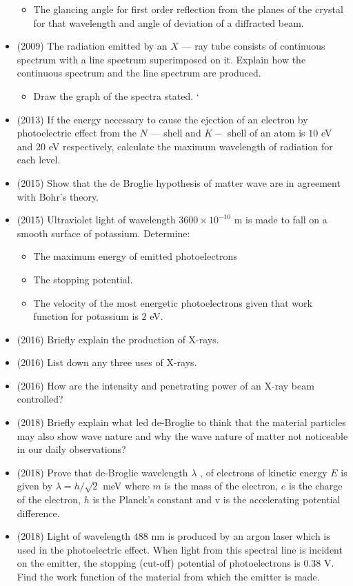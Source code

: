 \documentclass{article}
\begin{document}
\begin{itemize}
\begin{itemize}
\item The glancing angle for first order reflection from the planes of the crystal for that wavelength and angle of deviation of a diffracted beam.
\end{itemize}
\item (2009)  The radiation emitted by an $ X$ — ray tube consists of continuous spectrum with a line spectrum superimposed on it. Explain how the continuous spectrum and the line spectrum are produced.
 \begin{itemize}
\item Draw the graph of the spectra stated. ‘
\end{itemize}
\item (2013)  If the energy necessary to cause the ejection of an electron by photoelectric effect from the $ N$ — shell and $ K-$ shell of an atom is $ 10$ eV and $ 20$ eV respectively, calculate the maximum wavelength of radiation for each level.
\item (2015)  Show that the de Broglie hypothesis of matter wave are in agreement with Bohr’s theory.
\item (2015)  Ultraviolet light of wavelength $ 3600 \times 10^{-10}$ m is made to fall on a smooth surface of potassium. Determine:
 \begin{itemize}
\item The maximum energy of emitted photoelectrons
\item The stopping potential.
\item The velocity of the most energetic photoelectrons given that work function for potassium is $ 2$ eV.
\end{itemize}
\item (2016)  Briefly explain the production of X-rays.
\item (2016)  List down any three uses of X-rays.
\item (2016)  How are the intensity and penetrating power of an X-ray beam controlled?
\item (2018)  Briefly explain what led de-Broglie to think that the material particles may also show wave nature and why the wave nature of matter not noticeable in our daily observations? 
\item (2018)  Prove that de-Broglie wavelength $ \lambda $ , of electrons of kinetic energy $ E$ is given by $ \lambda = h/ \sqrt{2}$ meV  where $ m$ is the mass of the electron, $ e$ is the charge of the electron, $ h$ is the Planck’s constant and v is the accelerating potential difference. 
\item (2018)  Light of wavelength $ 488$ nm is produced by an argon laser which is used in the photoelectric effect. When light from this spectral line is incident on the emitter, the stopping (cut-off) potential of photoelectrons is $ 0.38$ V. Find the work function of the material from which the emitter is made. 

\end{itemize}
\end{document}
